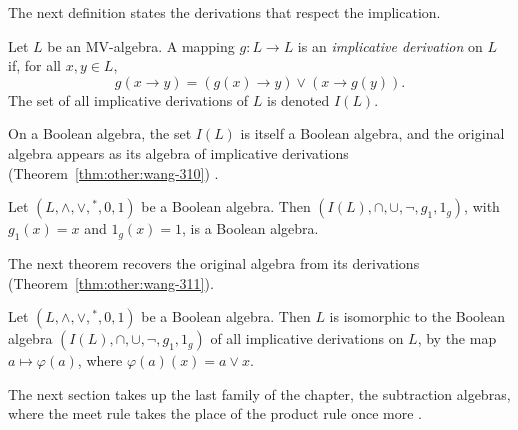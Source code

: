 The next definition states the derivations that respect the implication.

\begin{definition}\label{def:other:mv-implicative}
Let $L$ be an MV-algebra. A mapping $g \colon L \to L$ is an
\emph{implicative derivation} on $L$ if, for all $x, y \in L$,
\[
g(x \to y) = (g(x) \to y) \vee (x \to g(y)).
\]
The set of all implicative derivations of $L$ is denoted $I(L)$.
\end{definition}

On a Boolean algebra, the set $I(L)$ is itself a Boolean algebra, and the
original algebra appears as its algebra of implicative derivations (Theorem~\ref{thm:other:wang-310})
\cite[Theorem~3.10, p.~267]{WangSheQian2019}.\begin{theorem}\label{thm:other:wang-310}
Let $(L, \wedge, \vee, {}^{*}, 0, 1)$ be a Boolean algebra. Then
$(I(L), \cap, \cup, \neg, g_{1}, 1_{g})$, with $g_{1}(x) = x$ and
$1_{g}(x) = 1$, is a Boolean algebra.
\end{theorem}

The next theorem recovers the original algebra from its derivations (Theorem~\ref{thm:other:wang-311}).

\begin{theorem}\label{thm:other:wang-311}
Let $(L, \wedge, \vee, {}^{*}, 0, 1)$ be a Boolean algebra. Then $L$ is
isomorphic to the Boolean algebra $(I(L), \cap, \cup, \neg, g_{1}, 1_{g})$
of all implicative derivations on $L$, by the map $a \mapsto \varphi(a)$,
where $\varphi(a)(x) = a \vee x$.
\end{theorem}

The next section takes up the last family of the chapter, the subtraction
algebras, where the meet rule takes the place of the product rule once
more \cite[Definition~3.1, p.~511]{OzturkCeven2009}.
